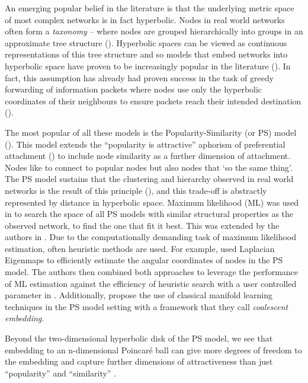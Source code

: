 \documentclass{IEEEtran}
\begin{document}
	An emerging popular belief in the literature is that the underlying metric space of most complex networks is in fact hyperbolic. 
	Nodes in real world networks often form a \textit{taxonomy} -- where nodes are grouped hierarchically into groups in an approximate tree structure (\cite{papadopoulos2011popularity}). 
	Hyperbolic spaces can be viewed as continuous representations of this tree structure and so models that embed networks into hyperbolic space have proven to be increasingly popular in the literature (\cite{krioukov2009curvature,krioukov2010hyperbolic}). In fact, this assumption has already had proven success in the task of greedy forwarding of information packets where nodes use only the hyperbolic coordinates of their neighbours to ensure packets reach their intended destination (\cite{papadopoulos2010greedy}). 
	
	The most popular of all these models is the Popularity-Similarity (or PS) model (\cite{papadopoulos2011popularity}). This model extends the ``popularity is attractive'' aphorism of preferential attachment (\cite{barabasi1999emergence}) to include node similarity as a further dimension of attachment. 
	Nodes like to connect to popular nodes but also nodes that `so the same thing'. The PS model sustains that the clustering and hierarchy observed in real world networks is the result of this principle (\cite{alanis2016efficient}), and this trade-off is abstractly represented by distance in hyperbolic space. 
	Maximum likelihood (ML) was used in \cite{papadopoulos2011popularity} to search the space of all PS models with similar structural properties as the observed network, to find the one that fit it best. This was extended by the authors in \cite{papadopoulos2015network,papadopoulos2015networkgeo}. Due to the computationally demanding task of maximum likelihood estimation, often heuristic methods are used. For example, \cite{alanis2016efficient} used Laplacian Eigenmaps to efficiently estimate the angular coordinates of nodes in the PS model. The authors then combined both approaches to leverage the performance of ML estimation against the efficiency of heuristic search with a user controlled parameter in \cite{alanis2016manifold}. Additionally, \cite{thomas2016machine} propose the use of classical manifold learning techniques in the PS model setting with a framework that they call \textit{coalescent embedding}. 
	
	Beyond the two-dimensional hyperbolic disk of the PS model, we see that embedding to an n-dimensional Poincar\'e ball can give more degrees of freedom to the embedding and capture further dimensions of attractiveness than just ``popularity'' and ``similarity'' \cite{nickel2017poincar}.
	
\end{document}
